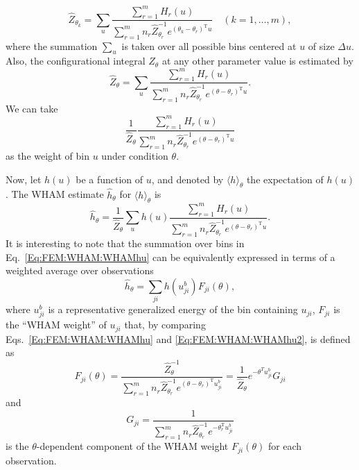 \begin{equation}
    \hat{Z}_{\theta_k}=\sum_{u}\frac{\sum_{r=1}^m H_r(u)}{\sum_{r=1}^m n_r\hat{Z}_{\theta_r}^{-1}e^{(\theta_k-\theta_r)^\mathrm{T}u}}\quad (k=1,\dots,m),
    \label{Eq:FEM:WHAM:binnedZ}
\end{equation}
where the summation $\sum_u$ is taken over all possible bins centered at $u$ of size $\Delta u$. Also, the configurational integral $Z_\theta$ at any other parameter value is estimated by
\begin{equation}
    \hat{Z}_\theta=\sum_{u}\frac{\sum_{r=1}^m H_r(u)}{\sum_{r=1}^m n_r\hat{Z}_{\theta_r}^{-1}e^{(\theta-\theta_r)^\mathrm{T}u}}.
    \label{Eq:FEM:WHEM:binweight1}
\end{equation}
We can take
\begin{equation}
    \frac{1}{\hat{Z}_\theta}\frac{\sum_{r=1}^m H_r(u)}{\sum_{r=1}^m n_r\hat{Z}_{\theta_r}^{-1}e^{(\theta-\theta_r)^\mathrm{T}u}}
    \label{Eq:FEM:WHEM:binweight2}
\end{equation}
as the weight of bin $u$ under condition $\theta$.

Now, let $h(u)$ be a function of $u$, and denoted by $\langle h\rangle_\theta$ the expectation of $h(u)$. The WHAM estimate $\hat{h}_\theta$ for $\langle h\rangle_\theta$ is
\begin{equation}
    \hat{h}_\theta=\frac{1}{\hat{Z}_\theta}\sum_u h(u) \frac{\sum_{r=1}^m H_r(u)}{\sum_{r=1}^m n_r\hat{Z}_{\theta_r}^{-1}e^{(\theta-\theta_r)^\mathrm{T}u}}.
    \label{Eq:FEM:WHAM:WHAMhu}
\end{equation}
It is interesting to note that the summation over bins in Eq.~\ref{Eq:FEM:WHAM:WHAMhu} can be equivalently expressed in terms of a weighted average over observations
\begin{equation}
    \hat{h}_{\theta}=\sum_{ji}h(u_{ji}^b)F_{ji}(\theta),
    \label{Eq:FEM:WHAM:WHAMhu2}
\end{equation}
where $u_{ji}^b$ is a representative generalized energy of the bin containing $u_{ji}$, $F_{ji}$ is the ``WHAM weight'' of $u_{ji}$ that, by comparing Eqs.~\ref{Eq:FEM:WHAM:WHAMhu} and \ref{Eq:FEM:WHAM:WHAMhu2}, is defined as
\begin{equation}
    F_{ji}(\theta)=\frac{\hat{Z}_\theta^{-1}}{\sum_{r=1}^mn_r\hat{Z}_{\theta_r}^{-1}e^{(\theta-\theta_r)^\mathrm{T}u_{ji}^b}}=\frac{1}{\hat{Z}_\theta}e^{-\theta^Tu_{ji}^b}G_{ji}
    \label{Eq:FEM:WHAM:sampleW}
\end{equation}
and 
\begin{equation}
    G_{ji}=\frac{1}{\sum_{r=1}^m n_r\hat{Z}_{\theta_r}^{-1}e^{-\theta_r^\mathrm{T}u_{ji}^b}}
\end{equation}
is the $\theta$-dependent component of the WHAM weight $F_{ji}(\theta)$ for each observation.

